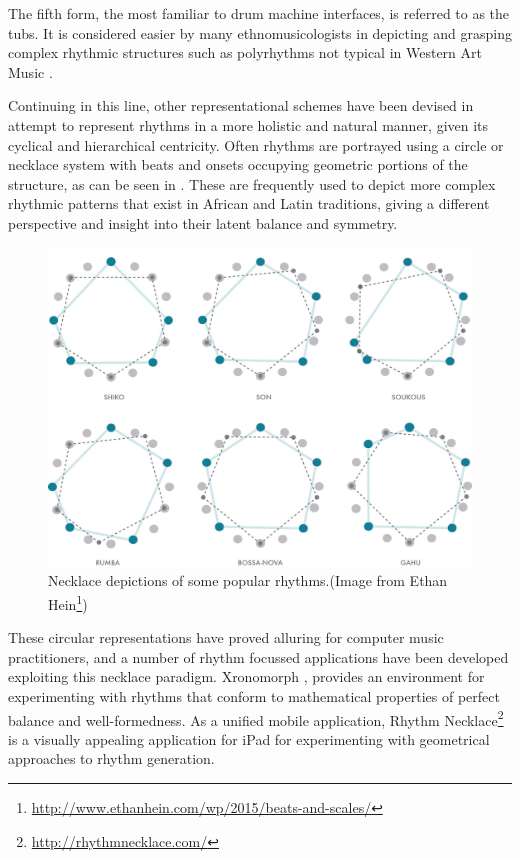The fifth form, the most familiar to drum machine interfaces, is referred to as the \acrfull{tubs}. It is considered easier by many ethnomusicologists in depicting and grasping complex rhythmic structures such as polyrhythms not typical in Western Art Music \citep{nzewi2008musical, koetting1970analysis}.  

Continuing in this line, other representational schemes have been devised in attempt to represent rhythms in a more holistic and natural manner, given its cyclical and hierarchical centricity. Often rhythms are portrayed using a circle or necklace system with beats and onsets occupying geometric portions of the structure, as can be seen in . These are frequently used to depict more complex rhythmic patterns that exist in African and Latin traditions, giving a different perspective and insight into their latent balance and symmetry.

\begin{figure}
	\begin{center}
		\includegraphics[width=\figSizeHundred]{ch03_symbolic/figures/necklace.jpg}
	\end{center}
	\caption[Necklace depictions of some popular rhythms.]{Necklace depictions of some popular rhythms.(Image from Ethan Hein\footnote{\url{http://www.ethanhein.com/wp/2015/beats-and-scales/}})}
	\label{fig:necklace}
\end{figure}

These circular representations have proved alluring for computer music practitioners, and a number of rhythm focussed applications have been developed exploiting this necklace paradigm. Xronomorph \citep{Milne2015a, Milne2016} , provides an environment for experimenting with rhythms that conform to mathematical properties of perfect balance and well-formedness. As a unified mobile application, Rhythm Necklace\footnote{\url{http://rhythmnecklace.com/}} is a visually appealing application for iPad for experimenting with geometrical approaches to rhythm generation.

